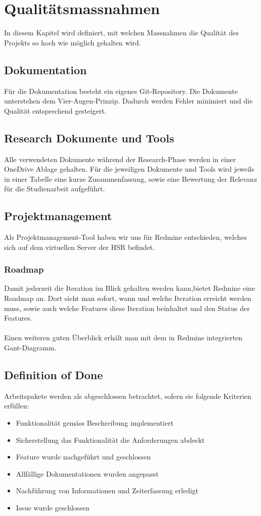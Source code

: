 \section{Qualitätsmassnahmen}
In diesem Kapitel wird definiert, mit welchen Massnahmen die Qualität des Projekts so hoch wie möglich gehalten wird.

\subsection{Dokumentation}
Für die Dokumentation besteht ein eigenes Git-Repository. Die Dokumente unterstehen dem Vier-Augen-Prinzip. Dadurch werden Fehler minimiert und die Qualität entsprechend gesteigert.

\subsection{Research Dokumente und Tools}
Alle verwendeten Dokumente während der Research-Phase werden in einer OneDrive Ablage gehalten. Für die jeweiligen Dokumente und Tools wird jeweils in einer Tabelle eine kurze Zusammenfassung, sowie eine Bewertung der Relevanz für die Studienarbeit aufgeführt.

\subsection{Projektmanagement}
Als Projektmanagement-Tool haben wir uns für Redmine entschieden, welches sich auf dem virtuellen Server der HSR befindet.

\subsubsection{Roadmap}
Damit jederzeit die Iteration im Blick gehalten werden kann,bietet Redmine eine Roadmap an. Dort sieht man sofort, wann und welche Iteration erreicht werden muss, sowie auch welche Features diese Iteration beinhaltet und den Status der Features.
\\\\
Einen weiteren guten Überblick erhält man mit dem in Redmine integrierten Gant-Diagramm.

\subsection{Definition of Done}
Arbeitspakete werden als abgeschlossen betrachtet, sofern sie folgende Kriterien erfüllen:
\begin{itemize}
    \item Funktionalität gemäss Beschreibung implementiert
    \item Sicherstellung das Funktionalität die Anforderungen abdeckt
    \item Feature wurde nachgeführt und geschlossen
    \item Allfällige Dokumentationen wurden angepasst
    \item Nachführung von Informationen und Zeiterfassung erledigt
    \item Issue wurde geschlossen
\end{itemize}

